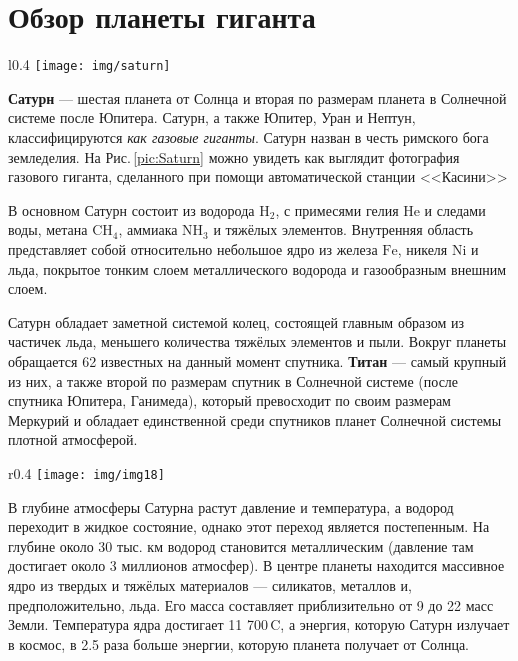 \documentclass[11pt,a4paper]{article}
\begin{document}
	\section{Обзор планеты гиганта}
	\begin{wrapfigure}[]{l}{0.4\textwidth}
		\vspace{-1pc}
		\texttt{[image: img/saturn]}
		\caption{Снимок планеты со станции <<Кассини>>}
		\label{pic:Saturn}
	\end{wrapfigure}	
	 \textbf{Сатурн} --- шестая планета от Солнца и вторая по размерам планета в Солнечной системе после Юпитера. Сатурн, а также Юпитер, Уран и Нептун, классифицируются \textit{как газовые гиганты}. Сатурн назван в честь римского бога земледелия. На Рис.\,\ref{pic:Saturn} можно увидеть как выглядит фотография газового гиганта, сделанного при помощи автоматической станции <<Касини>> \par
	 В основном Сатурн состоит из водорода $\mathrm{H_2}$, с примесями гелия $\mathrm{He}$ и следами воды, метана $\mathrm{CH_4}$, аммиака $\mathrm{NH_3}$ и тяжёлых элементов. Внутренняя область представляет собой относительно небольшое ядро из железа $\mathrm{Fe}$, никеля $\mathrm{Ni}$ и льда, покрытое тонким слоем металлического водорода и газообразным внешним слоем. \par
	 Сатурн обладает заметной системой колец, состоящей главным образом из частичек льда, меньшего количества тяжёлых элементов и пыли. Вокруг планеты обращается 62 известных на данный момент спутника. \textbf{Титан} --- самый крупный из них, а также второй по размерам спутник в Солнечной системе (после спутника Юпитера, Ганимеда), который превосходит по своим размерам Меркурий и обладает единственной среди спутников планет Солнечной системы плотной атмосферой.\par
	 \begin{wrapfigure}[]{r}{0.4\textwidth}
	 	\vspace{-1pc}
	 	\texttt{[image: img/img18]}
	 	\caption{Внутреннее строение Сатурна}	
	 \end{wrapfigure}
	 В глубине атмосферы Сатурна растут давление и температура, а водород переходит в жидкое состояние, однако этот переход является постепенным. На глубине около 30 тыс. км водород становится металлическим (давление там достигает около 3 миллионов атмосфер). В центре планеты находится массивное ядро из твердых и тяжёлых материалов --- силикатов, металлов и, предположительно, льда. Его масса составляет приблизительно от 9 до 22 масс Земли. Температура ядра достигает 11 700\,\degree C, а энергия, которую Сатурн излучает в космос, в 2.5 раза больше энергии, которую планета получает от Солнца.
\end{document}
